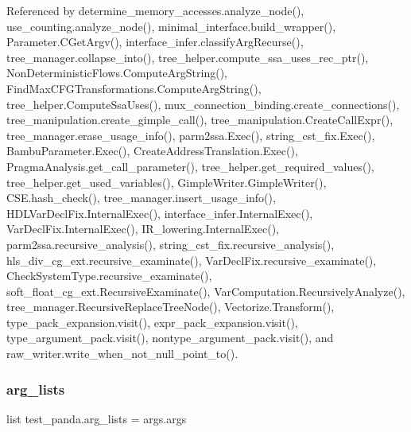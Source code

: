 Referenced by determine\+\_\+memory\+\_\+accesses.\+analyze\+\_\+node(), use\+\_\+counting.\+analyze\+\_\+node(), minimal\+\_\+interface.\+build\+\_\+wrapper(), Parameter.\+C\+Get\+Argv(), interface\+\_\+infer.\+classify\+Arg\+Recurse(), tree\+\_\+manager.\+collapse\+\_\+into(), tree\+\_\+helper.\+compute\+\_\+ssa\+\_\+uses\+\_\+rec\+\_\+ptr(), Non\+Deterministic\+Flows.\+Compute\+Arg\+String(), Find\+Max\+C\+F\+G\+Transformations.\+Compute\+Arg\+String(), tree\+\_\+helper.\+Compute\+Ssa\+Uses(), mux\+\_\+connection\+\_\+binding.\+create\+\_\+connections(), tree\+\_\+manipulation.\+create\+\_\+gimple\+\_\+call(), tree\+\_\+manipulation.\+Create\+Call\+Expr(), tree\+\_\+manager.\+erase\+\_\+usage\+\_\+info(), parm2ssa.\+Exec(), string\+\_\+cst\+\_\+fix.\+Exec(), Bambu\+Parameter.\+Exec(), Create\+Address\+Translation.\+Exec(), Pragma\+Analysis.\+get\+\_\+call\+\_\+parameter(), tree\+\_\+helper.\+get\+\_\+required\+\_\+values(), tree\+\_\+helper.\+get\+\_\+used\+\_\+variables(), Gimple\+Writer.\+Gimple\+Writer(), C\+S\+E.\+hash\+\_\+check(), tree\+\_\+manager.\+insert\+\_\+usage\+\_\+info(), H\+D\+L\+Var\+Decl\+Fix.\+Internal\+Exec(), interface\+\_\+infer.\+Internal\+Exec(), Var\+Decl\+Fix.\+Internal\+Exec(), I\+R\+\_\+lowering.\+Internal\+Exec(), parm2ssa.\+recursive\+\_\+analysis(), string\+\_\+cst\+\_\+fix.\+recursive\+\_\+analysis(), hls\+\_\+div\+\_\+cg\+\_\+ext.\+recursive\+\_\+examinate(), Var\+Decl\+Fix.\+recursive\+\_\+examinate(), Check\+System\+Type.\+recursive\+\_\+examinate(), soft\+\_\+float\+\_\+cg\+\_\+ext.\+Recursive\+Examinate(), Var\+Computation.\+Recursively\+Analyze(), tree\+\_\+manager.\+Recursive\+Replace\+Tree\+Node(), Vectorize.\+Transform(), type\+\_\+pack\+\_\+expansion.\+visit(), expr\+\_\+pack\+\_\+expansion.\+visit(), type\+\_\+argument\+\_\+pack.\+visit(), nontype\+\_\+argument\+\_\+pack.\+visit(), and raw\+\_\+writer.\+write\+\_\+when\+\_\+not\+\_\+null\+\_\+point\+\_\+to().

\mbox{\label{namespacetest__panda_acf2def5ffdab7a90494f531ad4942e6c}} 
\subsubsection{\texorpdfstring{arg\+\_\+lists}{arg\_lists}}
{\footnotesize\ttfamily list test\+\_\+panda.\+arg\+\_\+lists = args.\+args}



